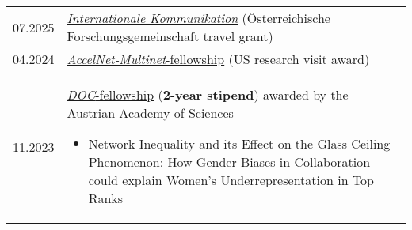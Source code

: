 
\begin{longtable}[l]{@{}p{} p{}}
    07.2025 & \href{https://www.oefg.at/foerderungen/internationale-kommunikation/}{\emph{Internationale Kommunikation}} (\"Osterreichische Forschungsgemeinschaft travel grant)\\
    04.2024 & \href{https://www.accelnet-multinet.org/}{\emph{AccelNet-Multinet}-fellowship} (US research visit award)\\
    11.2023 & \href{https://stipendien.oeaw.ac.at/en/fellowships/doc}{\emph{DOC}-fellowship} (\textbf{2-year stipend}) awarded by the Austrian Academy of Sciences
    \begin{itemize}
        \item \raggedright Network Inequality and its Effect on the Glass Ceiling Phenomenon: How Gender Biases in Collaboration could explain Women’s Underrepresentation in Top Ranks
    \end{itemize}

\end{longtable}

